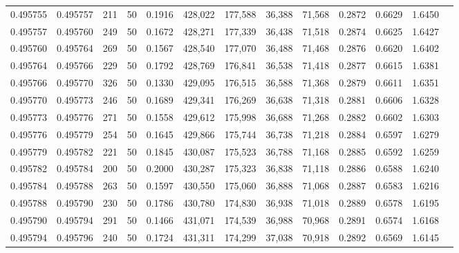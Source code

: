 \begin{tabular}{rrrrrrrrrrrrr}
0.495755 & 0.495757 &   211 &  50 &                                     0.1916 & 428,022 & 177,588 &  36,388 &  71,568 & 0.2872 & 0.6629 & 1.6450 \\
0.495757 & 0.495760 &   249 &  50 &                                     0.1672 & 428,271 & 177,339 &  36,438 &  71,518 & 0.2874 & 0.6625 & 1.6427 \\
0.495760 & 0.495764 &   269 &  50 &                                     0.1567 & 428,540 & 177,070 &  36,488 &  71,468 & 0.2876 & 0.6620 & 1.6402 \\
0.495764 & 0.495766 &   229 &  50 &                                     0.1792 & 428,769 & 176,841 &  36,538 &  71,418 & 0.2877 & 0.6615 & 1.6381 \\
0.495766 & 0.495770 &   326 &  50 &                                     0.1330 & 429,095 & 176,515 &  36,588 &  71,368 & 0.2879 & 0.6611 & 1.6351 \\
0.495770 & 0.495773 &   246 &  50 &                                     0.1689 & 429,341 & 176,269 &  36,638 &  71,318 & 0.2881 & 0.6606 & 1.6328 \\
0.495773 & 0.495776 &   271 &  50 &                                     0.1558 & 429,612 & 175,998 &  36,688 &  71,268 & 0.2882 & 0.6602 & 1.6303 \\
0.495776 & 0.495779 &   254 &  50 &                                     0.1645 & 429,866 & 175,744 &  36,738 &  71,218 & 0.2884 & 0.6597 & 1.6279 \\
0.495779 & 0.495782 &   221 &  50 &                                     0.1845 & 430,087 & 175,523 &  36,788 &  71,168 & 0.2885 & 0.6592 & 1.6259 \\
0.495782 & 0.495784 &   200 &  50 &                                     0.2000 & 430,287 & 175,323 &  36,838 &  71,118 & 0.2886 & 0.6588 & 1.6240 \\
0.495784 & 0.495788 &   263 &  50 &                                     0.1597 & 430,550 & 175,060 &  36,888 &  71,068 & 0.2887 & 0.6583 & 1.6216 \\
0.495788 & 0.495790 &   230 &  50 &                                     0.1786 & 430,780 & 174,830 &  36,938 &  71,018 & 0.2889 & 0.6578 & 1.6195 \\
0.495790 & 0.495794 &   291 &  50 &                                     0.1466 & 431,071 & 174,539 &  36,988 &  70,968 & 0.2891 & 0.6574 & 1.6168 \\
0.495794 & 0.495796 &   240 &  50 &                                     0.1724 & 431,311 & 174,299 &  37,038 &  70,918 & 0.2892 & 0.6569 & 1.6145 \\

\end{tabular}
